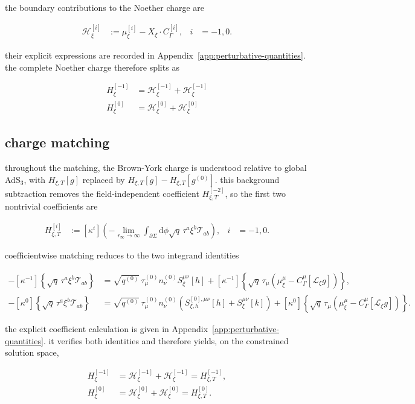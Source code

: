 the boundary contributions to the Noether charge are

\[\begin{aligned}
\mathscr{H}_{\xi}^{[i]} & :=\mu _{\xi}^{[i]}-X_{\xi}\mathbin{\cdot}C_{\Gamma}^{[i]}, & i&=-1,0.
\end{aligned}\]

their explicit expressions are recorded in Appendix~\ref{app:perturbative-quantities}. the complete Noether charge therefore splits as

\begin{align}
H_{\xi}^{[-1]} & =\mathcal{H}_{\xi}^{[-1]}+\mathscr{H}_{\xi}^{[-1]} \\
H_{\xi}^{[0]} & =\mathcal{H}_{\xi}^{[0]}+\mathscr{H}_{\xi}^{[0]}
\end{align}

\subsection{charge matching}\label{subsec:charge-matching}

throughout the matching, the Brown-York charge is understood relative to global AdS$\displaystyle{_{3}}$, with $\displaystyle{H_{\xi,T}[g]}$ replaced by $\displaystyle{H_{\xi,T}[g]-H_{\xi,T}[g^{(0)}]}$. this background subtraction removes the field-independent coefficient $\displaystyle{H_{\xi,T}^{[-2]}}$, so the first two nontrivial coefficients are

\begin{align}
H_{\xi,T}^{[i]} & :=\left[\kappa ^{i}\right]\left(-\lim _{r_{\infty}\to\infty}\int _{\partial \Sigma}\mathrm{d}\phi\sqrt{q}\,\tau ^{a}\xi ^{b}\mathcal{T}_{ab}\right), & i&=-1,0.
\end{align}

coefficientwise matching reduces to the two integrand identities

\[\begin{aligned}
-[\kappa ^{-1}]\left\{\sqrt{q}\,\tau ^{a}\xi ^{b}\mathcal{T}_{ab} \right\}& =\sqrt{q^{(0)}}\,\tau _{\mu}^{(0)}n_{\nu}^{(0)}S_{\xi}^{\mu \nu}[h]+\left[\kappa ^{-1}\right]\left\{\sqrt{q}\,\tau _{\mu}\left(\mu _{\xi}^{\mu}-C_{\Gamma}^{\mu}[\mathcal{L}_{\xi}g]\right)\right\}, \\
-[\kappa ^{0}]\left\{\sqrt{q}\,\tau ^{a}\xi ^{b}\mathcal{T}_{ab}\right\}&=\sqrt{q^{(0)}}\,\tau _{\mu}^{(0)}n_{\nu}^{(0)}\left(S_{\xi,h}^{[0],\mu \nu}[h]+S_{\xi}^{\mu \nu}[k]\right)+\left[\kappa ^{0}\right]\left\{\sqrt{q}\,\tau _{\mu}\left(\mu _{\xi}^{\mu}-C_{\Gamma}^{\mu}[\mathcal{L}_{\xi}g]\right)\right\}.
\end{aligned}\]

the explicit coefficient calculation is given in Appendix~\ref{app:perturbative-quantities}. it verifies both identities and therefore yields, on the constrained solution space,

\[\begin{aligned}
H_{\xi}^{[-1]} & =\mathcal{H}_{\xi}^{[-1]}+\mathscr{H}_{\xi}^{[-1]}=H_{\xi,T}^{[-1]}, \\
H_{\xi}^{[0]} & =\mathcal{H}_{\xi}^{[0]}+\mathscr{H}_{\xi}^{[0]}=H_{\xi,T}^{[0]}.
\end{aligned}\]
